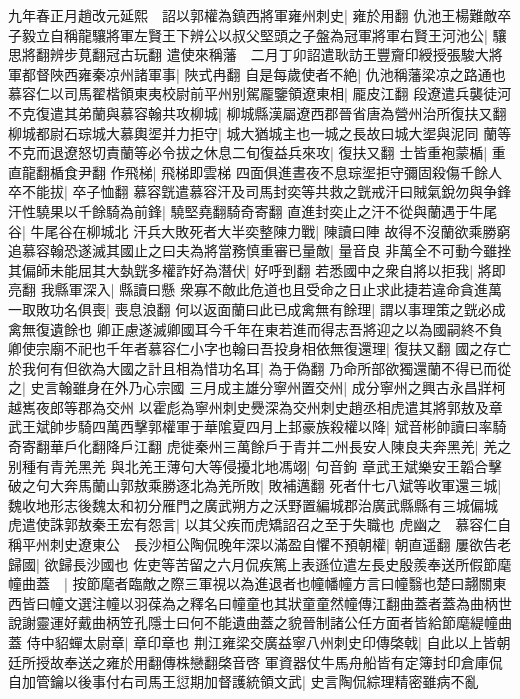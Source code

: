 九年春正月趙改元延熙　詔以郭權為鎮西將軍雍州刺史|{
	雍於用翻}
仇池王楊難敵卒子毅立自稱龍驤將軍左賢王下辨公以叔父堅頭之子盤為冠軍將軍右賢王河池公|{
	驤思將翻辨步莧翻冠古玩翻}
遣使來稱藩　二月丁卯詔遣耿訪王豐齎印綬授張駿大將軍都督陜西雍秦凉州諸軍事|{
	陜式冉翻}
自是每歲使者不絶|{
	仇池稱藩梁凉之路通也}
慕容仁以司馬翟楷領東夷校尉前平州别駕龎鑒領遼東相|{
	龎皮江翻}
段遼遣兵襲徒河不克復遣其弟蘭與慕容翰共攻柳城|{
	柳城縣漢屬遼西郡晉省唐為營州治所復扶又翻}
柳城都尉石琮城大慕輿埿并力拒守|{
	城大猶城主也一城之長故曰城大埿與泥同}
蘭等不克而退遼怒切責蘭等必令拔之休息二旬復益兵來攻|{
	復扶又翻}
士皆重袍蒙楯|{
	重直龍翻楯食尹翻}
作飛梯|{
	飛梯即雲梯}
四面俱進晝夜不息琮埿拒守彌固殺傷千餘人卒不能拔|{
	卒子恤翻}
慕容皝遣慕容汗及司馬封奕等共救之皝戒汗曰賊氣銳勿與争鋒汗性驍果以千餘騎為前鋒|{
	驍堅堯翻騎奇寄翻}
直進封奕止之汗不從與蘭遇于牛尾谷|{
	牛尾谷在柳城北}
汗兵大敗死者大半奕整陳力戰|{
	陳讀曰陣}
故得不沒蘭欲乘勝窮追慕容翰恐遂滅其國止之曰夫為將當務慎重審已量敵|{
	量音良}
非萬全不可動今雖挫其偏師未能屈其大埶皝多權詐好為潛伏|{
	好呼到翻}
若悉國中之衆自將以拒我|{
	將即亮翻}
我縣軍深入|{
	縣讀曰懸}
衆寡不敵此危道也且受命之日止求此捷若違命貪進萬一取敗功名俱喪|{
	喪息浪翻}
何以返面蘭曰此已成禽無有餘理|{
	謂以事理策之皝必成禽無復遺餘也}
卿正慮遂滅卿國耳今千年在東若進而得志吾將迎之以為國嗣終不負卿使宗廟不祀也千年者慕容仁小字也翰曰吾投身相依無復還理|{
	復扶又翻}
國之存亡於我何有但欲為大國之計且相為惜功名耳|{
	為于偽翻}
乃命所部欲獨還蘭不得已而從之|{
	史言翰雖身在外乃心宗國}
三月成主雄分寧州置交州|{
	成分寧州之興古永昌牂柯越嶲夜郎等郡為交州}
以霍彪為寧州刺史㸑深為交州刺史趙丞相虎遣其將郭敖及章武王斌帥步騎四萬西擊郭權軍于華隂夏四月上邽豪族殺權以降|{
	斌音彬帥讀曰率騎奇寄翻華戶化翻降戶江翻}
虎徙秦州三萬餘戶于青并二州長安人陳良夫奔黑羌|{
	羌之别種有青羌黑羌}
與北羌王薄句大等侵擾北地馮翊|{
	句音鉤}
章武王斌樂安王韜合擊破之句大奔馬蘭山郭敖乘勝逐北為羌所敗|{
	敗補邁翻}
死者什七八斌等收軍還三城|{
	魏收地形志後魏太和初分雁門之廣武朔方之沃野置編城郡治廣武縣縣有三城偏城}
虎遣使誅郭敖秦王宏有怨言|{
	以其父疾而虎矯詔召之至于失職也}
虎幽之　慕容仁自稱平州刺史遼東公　長沙桓公陶侃晚年深以滿盈自懼不預朝權|{
	朝直遥翻}
屢欲告老歸國|{
	欲歸長沙國也}
佐吏等苦留之六月侃疾篤上表遜位遣左長史殷羨奉送所假節麾幢曲蓋　|{
	按節麾者臨敵之際三軍視以為進退者也幢幡幢方言曰幢翳也楚曰翿關東西皆曰幢文選注幢以羽葆為之釋名曰幢童也其狀童童然幢傳江翻曲蓋者蓋為曲柄世說謝靈運好戴曲柄笠孔隱士曰何不能遺曲蓋之貌晉制諸公任方面者皆給節麾緹幢曲蓋}
侍中貂蟬太尉章|{
	章印章也}
荆江雍梁交廣益寧八州刺史印傳棨戟|{
	自此以上皆朝廷所授故奉送之雍於用翻傳株戀翻棨音啓}
軍資器仗牛馬舟船皆有定簿封印倉庫侃自加管鑰以後事付右司馬王愆期加督護統領文武|{
	史言陶侃綜理精密雖病不亂}
